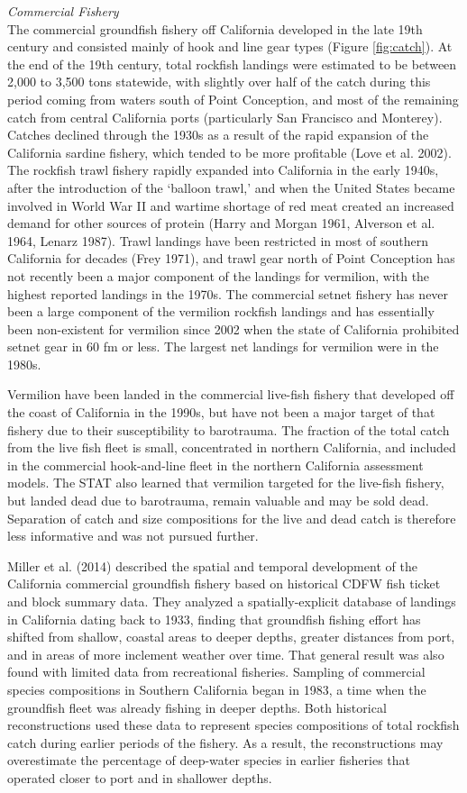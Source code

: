 \documentclass[
  english,
  a4paper,
]{article}
\begin{document}
\emph{Commercial Fishery}\\
The commercial groundfish fishery off California developed in the late 19th
century and consisted mainly of hook and line gear types (Figure \ref{fig:catch}).
At the end of the 19th century, total rockfish landings were estimated to be between
2,000 to 3,500 tons statewide, with slightly over half of the catch during this
period coming from waters south of Point Conception, and most of the remaining
catch from central California ports (particularly San Francisco and Monterey).
Catches declined through the 1930s as a result of the rapid expansion of the
California sardine fishery, which tended to be more profitable (Love et al. 2002).
The rockfish trawl fishery rapidly expanded into California in the early 1940s,
after the introduction of the `balloon trawl,' and when the United States became
involved in World War II and wartime shortage of red
meat created an increased demand for other sources of protein (Harry and Morgan 1961, Alverson et al. 1964, Lenarz 1987). Trawl landings have been restricted in most of southern
California for decades (Frey 1971), and trawl gear north of Point Conception has
not recently been a major component of the landings for vermilion, with the
highest reported landings in the 1970s. The commercial setnet fishery has never
been a large component of the vermilion rockfish landings and has essentially
been non-existent for vermilion since 2002 when the state of California prohibited
setnet gear in 60 fm or less. The largest net landings for vermilion were in the 1980s.

Vermilion have been landed in the commercial live-fish fishery that developed
off the coast of
California in the 1990s, but have not been a major target of that fishery due
to their susceptibility to barotrauma. The fraction of the total catch
from the live fish fleet is small, concentrated in northern California, and
included in the commercial hook-and-line fleet in the northern California
assessment models. The STAT also learned that vermilion targeted for the live-fish
fishery, but landed dead due to barotrauma, remain valuable and may be sold dead.
Separation of catch and size compositions for the live and dead catch is therefore
less informative and was not pursued further.

Miller et al. (2014) described the spatial and temporal development of the
California commercial groundfish fishery based on historical CDFW fish ticket
and block summary data. They analyzed a spatially-explicit database of
landings in California dating back to 1933, finding that groundfish fishing effort
has shifted from shallow, coastal areas to deeper depths, greater distances from
port, and in areas of more inclement weather over time. That general result was
also found with limited data from recreational fisheries. Sampling of commercial
species compositions in Southern California began in 1983, a time when the
groundfish fleet was already fishing in deeper depths.
Both historical reconstructions used these data to represent species compositions of
total rockfish catch during earlier periods of the fishery. As a result, the
reconstructions may overestimate the percentage of deep-water species in earlier
fisheries that operated closer to port and in shallower depths.
\end{document}
